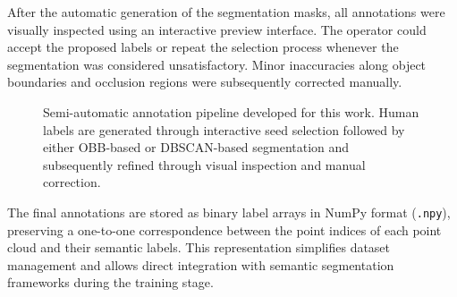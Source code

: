After the automatic generation of the segmentation masks, all annotations were visually inspected using an interactive preview interface. The operator could accept the proposed labels or repeat the selection process whenever the segmentation was considered unsatisfactory. Minor inaccuracies along object boundaries and occlusion regions were subsequently corrected manually.
\begin{figure}[H]
\centering
{}

\caption{Semi-automatic annotation pipeline developed for this work. Human labels are generated through interactive seed selection followed by either OBB-based or DBSCAN-based segmentation and subsequently refined through visual inspection and manual correction.}
\label{fig:annotation_pipeline}
\end{figure}
The final annotations are stored as binary label arrays in NumPy format (\texttt{.npy}), preserving a one-to-one correspondence between the point indices of each point cloud and their semantic labels. This representation simplifies dataset management and allows direct integration with semantic segmentation frameworks during the training stage.

